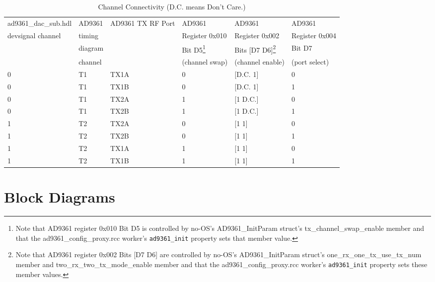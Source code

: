 \documentclass{article}
\def\comp{ad9361\_dac\_sub}
\begin{document}
\begin{scriptsize}
	\centering
	\begin{longtable}{|p{3cm}|p{1.8cm}|p{3.5cm}|p{1.9cm}|p{2.1cm}|p{2cm}|}
		\caption{Channel Connectivity (D.C. means Don't Care.)} \\
		\hline
		\rowcolor{blue}
		\comp.hdl & AD9361  & AD9361 TX RF Port & AD9361 & AD9361 & AD9361 \\
		\rowcolor{blue}
		devsignal channel & timing &   & Register 0x010 & Register 0x002 & Register 0x004 \\
		\rowcolor{blue}
		& diagram  & & Bit D5\footnote{Note that AD9361 register 0x010 Bit D5 is controlled by no-OS's AD9361\_InitParam struct's tx\_channel\_swap\_enable member\cite{adi_ug570} and that the ad9361\_config\_proxy.rcc worker's \texttt{ad9361\_init} property sets that member value\cite{config_proxy_comp_datasheet}.} & Bits [D7 D6]\footnote{Note that AD9361 register 0x002 Bits [D7 D6] are controlled by no-OS's AD9361\_InitParam struct's one\_rx\_one\_tx\_use\_tx\_num member and two\_rx\_two\_tx\_mode\_enable member\cite{adi_ug570} and that the ad9361\_config\_proxy.rcc worker's \texttt{ad9361\_init} property sets these member values\cite{config_proxy_comp_datasheet}.} & Bit D7 \\
		\rowcolor{blue}
		& channel & & (channel swap) & (channel enable) & (port select) \\
		\hline
		0 & T1 & TX1A         & 0 & [D.C. 1]  & 0 \\
		0 & T1 & TX1B         & 0 & [D.C. 1]  & 1 \\
		\hline
		0 & T1 & TX2A         & 1 & [1 D.C.] & 0 \\
		0 & T1 & TX2B         & 1 & [1 D.C.] & 1 \\
		\hline
		1 \footref{t2}  & T2 \footref{t2} & TX2A         & 0 & [1 1]  & 0 \\
		1 \footref{t2} & T2 \footref{t2} & TX2B         & 0 & [1 1]  & 1 \\
		\hline
		1 \footref{t2} & T2 \footref{t2} & TX1A         & 1 & [1 1] & 0 \\
		1 \footref{t2} & T2 \footref{t2} & TX1B         & 1 & [1 1] & 1 \\
		\hline
	\end{longtable}
\end{scriptsize}

\section*{Block Diagrams}
\end{document}
